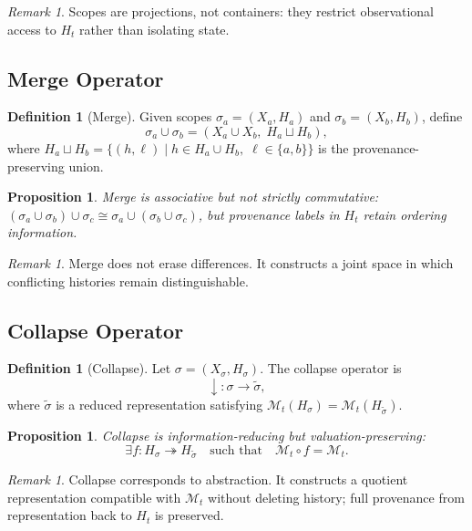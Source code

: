 \documentclass[11pt,a4paper]{article}
\newtheorem{proposition}[theorem]{Proposition}
\theoremstyle{definition}
\newtheorem{definition}[theorem]{Definition}
\theoremstyle{remark}
\newtheorem{remark}[theorem]{Remark}
\begin{document}
\begin{remark}
Scopes are projections, not containers: they restrict observational access to $H_t$ rather than isolating state.
\end{remark}

\subsection{Merge Operator}

\begin{definition}[Merge]
Given scopes $\sigma_a = (X_a, H_a)$ and $\sigma_b = (X_b, H_b)$, define
\[
\sigma_a \cup \sigma_b = (X_a \cup X_b,\; H_a \sqcup H_b),
\]
where $H_a \sqcup H_b = \{(h, \ell) \mid h \in H_a \cup H_b,\; \ell \in \{a,b\}\}$ is the provenance-preserving union.
\end{definition}

\begin{proposition}
Merge is associative but not strictly commutative: $(\sigma_a \cup \sigma_b) \cup \sigma_c \cong \sigma_a \cup (\sigma_b \cup \sigma_c)$, but provenance labels in $H_t$ retain ordering information.
\end{proposition}

\begin{remark}
Merge does not erase differences. It constructs a joint space in which conflicting histories remain distinguishable.
\end{remark}

\subsection{Collapse Operator}

\begin{definition}[Collapse]
Let $\sigma = (X_\sigma, H_\sigma)$. The collapse operator is
\[
\downarrow : \sigma \to \tilde{\sigma},
\]
where $\tilde{\sigma}$ is a reduced representation satisfying $\mathcal{M}_t(H_\sigma) = \mathcal{M}_t(H_{\tilde{\sigma}})$.
\end{definition}

\begin{proposition}
Collapse is information-reducing but valuation-preserving:
\[
\exists f : H_\sigma \twoheadrightarrow H_{\tilde{\sigma}} \quad \text{such that}\quad \mathcal{M}_t \circ f = \mathcal{M}_t.
\]
\end{proposition}

\begin{remark}
Collapse corresponds to abstraction. It constructs a quotient representation compatible with $\mathcal{M}_t$ without deleting history; full provenance from representation back to $H_t$ is preserved.
\end{remark}
\end{document}
